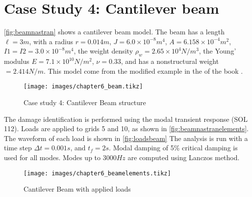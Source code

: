 \section{Case Study 4: Cantilever beam}

\autoref{fig:beamnastran} shows a cantilever beam model. The beam has a length $\ell = 3m$, with a radius $r = 0.014m$, $J = 6.0\times10^{-8}m^4$, $A=6.158\times10^{-4}m^2$, $I1 = I2 = 3.0\times10^{-8}m^4$, the weight density $\rho_w = 2.65\times10^{4}N/m^3$, the Young' modulus $E = 7.1\times10^{10}N/m^2$, $\nu=0.33$, and has a nonstructural weight $= 2.414N/m$. This model come from the modified example in the  of the book  \cite{nastran2004basic}.

\begin{figure}[H]
\caption{Case study 4: Cantilever Beam structure}
\label{fig:beamnastran}
\centering
\texttt{[image: images/chapter6\_beam.tikz]}
\end{figure}

The damage identification is performed using the modal transient response (SOL 112). Loads are applied to grids 5 and 10, as shown in \autoref{fig:beamnastranelements}. The waveform of each load is shown in \autoref{fig:loadsbeam} The analysis is run with a time step $\Delta t=0.001s$, and $t_f = 2s$. Modal damping of 5\% critical damping is used for all modes. Modes up to $3000Hz$ are computed using Lanczos method.

\begin{figure}[H]
\caption{Cantilever Beam with applied loads}
\label{fig:beamnastranelements}
\centering
\texttt{[image: images/chapter6\_beamelements.tikz]}
\end{figure}

